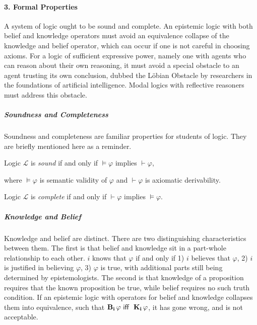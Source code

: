 
\paragraph{3. Formal Properties}

A system of logic ought to be sound and complete. An epistemic logic with both belief and knowledge operators must avoid an equivalence collapse of the knowledge and belief operator, which can occur if one is not careful in choosing axioms. For a logic of sufficient expressive power, namely one with agents who can reason about their own reasoning, it must avoid a special obstacle to an agent trusting its own conclusion, dubbed the L\"obian Obstacle by researchers in the foundations of artificial intelligence. Modal logics with reflective reasoners must address this obstacle. 

\subparagraph{Soundness and Completeness}
Soundness and completeness are familiar properties for students of logic. They are briefly mentioned here as a reminder.
\begin{definition}[Soundness]
	Logic $\mathcal{L}$ is \emph{sound} if and only if $\models\varphi$ implies $\vdash\varphi$,
\end{definition}
where $\models\varphi$ is semantic validity of $\varphi$ and $\vdash\varphi$ is axiomatic derivability.

\begin{definition}[Completeness]
	Logic $\mathcal{L}$ is \emph{complete} if and only if $\vdash\varphi$ implies $\models\varphi$.
\end{definition}

\subparagraph{Knowledge and Belief}
Knowledge and belief are distinct. There are two distinguishing characteristics between them. The first is that belief and knowledge sit in a part-whole relationship to each other. $i$ knows that $\varphi$ if and only if 1) $i$ believes that $\varphi$, 2) $i$ is justified in believing $\varphi$, 3) $\varphi$ is true, with additional parts still being determined by epistemologists. The second is that knowledge of a proposition requires that the known proposition be true, while belief requires no such truth condition. If an epistemic logic with operators for belief and knowledge collapses them into equivalence, such that $\mathbf{B}_{\mathbf{i}}\,\varphi \textsf{\ iff \ } \mathbf{K}_{\mathbf{i}}\,\varphi$, it has gone wrong, and is not acceptable.



